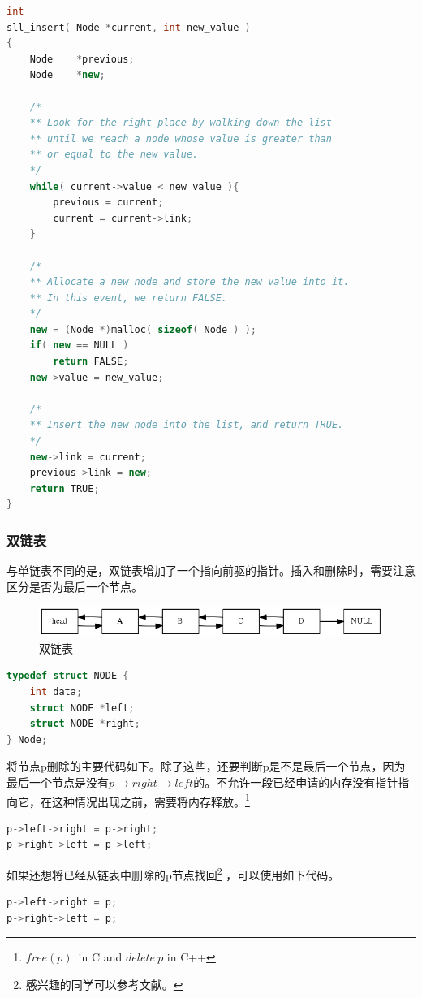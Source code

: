 \documentclass[a4paper]{article}
\begin{document}
\begin{CJK}{UTF8}{gbsn}
\begin{lstlisting}[language=C++]
int
sll_insert( Node *current, int new_value )
{
	Node	*previous;
	Node	*new;

	/*
	** Look for the right place by walking down the list
	** until we reach a node whose value is greater than
	** or equal to the new value.
	*/
	while( current->value < new_value ){
		previous = current;
		current = current->link;
	}

	/*
	** Allocate a new node and store the new value into it.
	** In this event, we return FALSE.
	*/
	new = (Node *)malloc( sizeof( Node ) );
	if( new == NULL )
		return FALSE;
	new->value = new_value;

	/*
	** Insert the new node into the list, and return TRUE.
	*/
	new->link = current;
	previous->link = new;
	return TRUE;
}
\end{lstlisting}

\subsubsection{双链表}

与单链表不同的是，双链表增加了一个指向前驱的指针。插入和删除时，需要注意区分是否为最后一个节点。

\begin{figure}[htbp]
\centering\includegraphics[height=1cm]{dlinklist.png}
\caption{双链表}
\end{figure}
\newpage
\begin{lstlisting}[language=C++]
typedef struct NODE {
	int data;
	struct NODE *left;
	struct NODE *right;
} Node;
\end{lstlisting}


将节点p删除的主要代码如下。除了这些，还要判断p是不是最后一个节点，因为最后一个节点是没有$p\rightarrow right\rightarrow left$的。不允许一段已经申请的内存没有指针指向它，在这种情况出现之前，需要将内存释放。\footnote{$free(p)$\ in C and $delete\ p$ in C++}
\begin{lstlisting}[language=C++]
p->left->right = p->right;
p->right->left = p->left;
\end{lstlisting}

如果还想将已经从链表中删除的p节点找回\footnote{感兴趣的同学可以参考文献\cite{knuth2000dancing}。} ，可以使用如下代码。
\begin{lstlisting}[language=C++]
p->left->right = p;
p->right->left = p;
\end{lstlisting}


\end{CJK}
\end{document}

